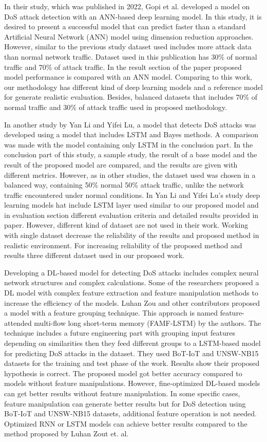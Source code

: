 \documentclass{article}
\begin{document}
In their study, which was published in 2022, Gopi et al. developed a model on DoS attack detection with an ANN-based deep learning model\cite{Gopi}. In this study, it is desired to present a successful model that can predict faster than a standard Artificial Neural Network (ANN) model using dimension reduction approaches. However, similar to the previous study dataset used includes more attack data than normal network traffic. Dataset used in this publication has 30\% of normal traffic and 70\% of attack traffic. In the result section of the paper proposed model performance is compared with an ANN model. Comparing to this work, our methodology has different kind of deep learning models and a reference model for generate realistic evaluation. Besides, balanced datasets that includes 70\% of normal traffic and 30\% of attack traffic used in proposed methodology.

In another study by Yan Li and Yifei Lu, a model that detects DoS attacks was developed using a model that includes LSTM and Bayes methods. A comparison was made with the model containing only LSTM in the conclusion part\cite{Li}. In the conclusion part of this study, a sample study, the result of a base model and the result of the proposed model are compared, and the results are given with different metrics. However, as in other studies, the dataset used was chosen in a balanced way, containing 50\% normal 50\% attack traffic, unlike the network traffic encountered under normal conditions. In Yan Li and Yifei Lu's study deep learning models hat include LSTM layer used similar to our proposed model and in evaluation section different evaluation criteria and detailed results provided in paper. However, different kind of dataset are not used in their work. Working with single dataset decrease the reliability of the results and proposed method in realistic environment. For increasing reliability of the proposed method and results three different dataset used in our proposed work.

Developing a DL-based model for detecting DoS attacks includes complex neural network structures and complex calculations. Some of the researchers proposed a DL model with complex feature extraction and feature manipulation methods to increase the efficiency of the models. Luhan Zou and other contributors proposed a model with a feature grouping technique\cite{LuhanZou}. This approach is named feature-attended multi-flow long short-term memory (FAMF-LSTM) by the authors. The technique includes a future engineering part with grouping input features depending on similarities then they feed different groups to a LSTM-based model for predicting DoS attacks in the dataset. They used BoT-IoT and UNSW-NB15 datasets for the training and test phase of the work.
Results show their proposed hypothesis is correct. The proposed model got better accuracy compared to models without feature manipulations. However, fine-optimized DL-based models can get better results without feature manipulation. In some specific cases, feature manipulation can generate better results but for DoS detection using BoT-IoT and UNSW-NB15 datasets, additional feature operation is not needed. Optimized RNN or LSTM models can achieve better results compared to the method proposed by Luhan Zout et. al.
\end{document}
